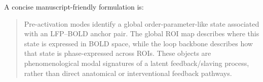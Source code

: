 \documentclass[11pt,a4paper]{article}
\begin{document}
A concise manuscript-friendly formulation is:
\begin{quote}
Pre-activation modes identify a global order-parameter-like state associated with an LFP--BOLD anchor pair. The global ROI map describes where this state is expressed in BOLD space, while the loop backbone describes how that state is phase-expressed across ROIs. These objects are phenomenological modal signatures of a latent feedback/slaving process, rather than direct anatomical or interventional feedback pathways.
\end{quote}
\end{document}

